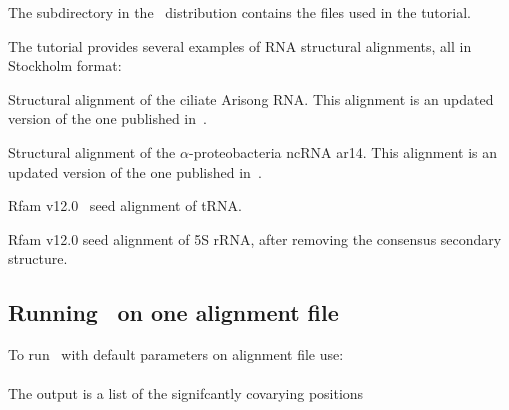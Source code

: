 The subdirectory  in the \rscape\ distribution contains the
files used in the tutorial. 

The tutorial provides several examples of RNA structural
alignments, all in Stockholm format:

\begin{sreitems}{}
\item[\emprog{updated\_Arisong.sto}] Structural alignment of the ciliate
  Arisong RNA. This alignment is an updated
  version of the one published in~\citep{JungEddy11}.
\item[\emprog{ar14.sto}] Structural alignment of the $\alpha$-proteobacteria ncRNA ar14. This alignment is an updated version of the one
  published in~\citep{delVal12}.
\item[\emprog{RF00005.sto}] Rfam v12.0~\citep{Nawrocki15} seed alignment of tRNA. 
\item[\emprog{RF00001-noss.sto}] Rfam v12.0 seed alignment of 5S rRNA, after removing the consensus secondary structure. 
\end{sreitems}


\subsection{Running \rscape\, on one alignment file}
To run \rscape\ with default parameters on alignment file
 use:\\

\\

\noindent
The output is a list of the signifcantly covarying positions

